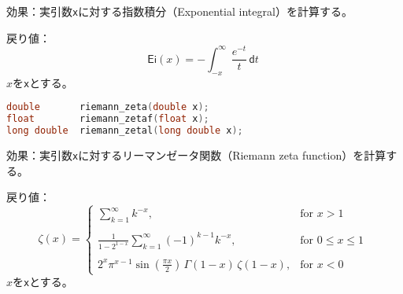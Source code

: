 \noindent
\textsf{効果}：実引数\lstinline!x!に対する指数積分（Exponential
integral）を計算する。

\noindent
\textsf{戻り値}：
\[
  \mathsf{Ei}(x) =
  - \int_{-x}^\infty \frac{e^{-t}}
                          {t     } \, \mathsf{d}t
\;
\]
\hspace*{3em}\(x\)を\lstinline!x!とする。

%

\bgroup
\begin{lstlisting}[language=C++, aboveskip=0.0zw]
double       riemann_zeta(double x);
float        riemann_zetaf(float x);
long double  riemann_zetal(long double x);
\end{lstlisting}
\egroup

\noindent
\textsf{効果}：実引数\lstinline!x!に対するリーマンゼータ関数（Riemann
zeta function）を計算する。

\noindent
\textsf{戻り値}：
\[
  \mathsf{\zeta}(x) =
  \left\{
  \begin{array}{cl}
  \displaystyle
  \sum_{k=1}^\infty k^{-x},
  & \mbox{for $x > 1$}
  \\
  \\
  \displaystyle
  \frac{1}
    {1 - 2^{1-x}}
  \sum_{k=1}^\infty (-1)^{k-1} k^{-x},
  & \mbox{for $0 \le x \le 1$}
  \\
  \\
  \displaystyle
  2^x \pi^{x-1} \sin(\frac{\pi x}{2}) \, \Gamma(1-x) \, \zeta(1-x),
  & \mbox{for $x < 0$}
  \end{array}
  \right.
\;
\]
\hspace*{3em}\(x\)を\lstinline!x!とする。

